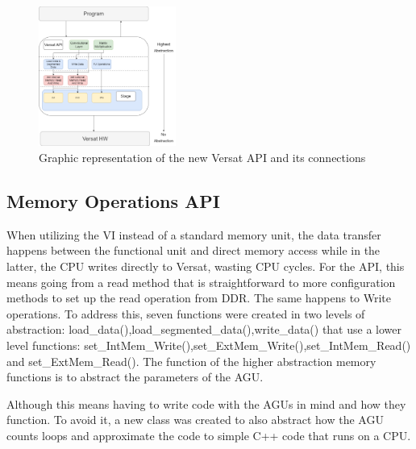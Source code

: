 \documentclass[conference]{IEEEtran}
\begin{document}
\begin{figure}[!htbp]
    \centering
    \includegraphics[width=0.4\textwidth]{Figures/VersatMemory.drawio.png}
    \caption{Graphic representation of the new Versat API and its connections}
    \label{newAPI}
\end{figure} 


\subsection{Memory Operations API}

When utilizing the VI instead of a standard memory unit, the data transfer happens between the functional unit and direct memory access while
in the latter, the CPU writes directly to Versat, wasting CPU cycles. For the API, this means going from a read method that is straightforward
to more configuration methods to set up the read operation from DDR. The same happens to Write operations. To address this, seven functions were created in two levels of abstraction:
load\_data(),load\_segmented\_data(),write\_data() that use a lower level functions: set\_IntMem\_Write(),set\_ExtMem\_Write(),set\_IntMem\_Read() and set\_ExtMem\_Read().
The function of the higher abstraction memory functions is to abstract the parameters of the AGU. 

% 


Although this means having to write code with the AGUs in mind
and how they function. To avoid it, a new class was created to also abstract how the AGU counts loops and approximate 
the code to simple C++ code that runs on a CPU.

% 
\end{document}
